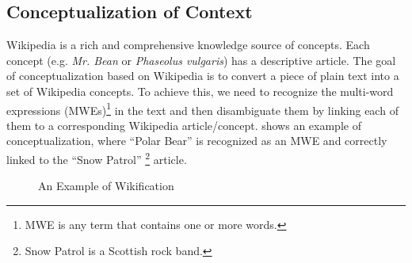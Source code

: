 \subsection{Conceptualization of Context}



Wikipedia is a rich and comprehensive knowledge source of concepts.
Each concept (e.g. {\em Mr. Bean} or {\em Phaseolus vulgaris}) has a
descriptive article.
The goal of conceptualization based on Wikipedia is
to convert a piece of plain text into a set of Wikipedia concepts.
To achieve this, we need to recognize the multi-word expressions 
(MWEs)\footnote{MWE is any term that contains one or more words.}
in the text and then disambiguate them
by linking each of them to a corresponding Wikipedia article/concept.
%
 shows an example of conceptualization, where
``Polar Bear'' is recognized as
an MWE and correctly linked to the ``Snow Patrol''
\footnote{Snow Patrol is a Scottish rock band.} article.
\begin{figure}
\centering
{}
\caption{An Example of Wikification}
\label{fig:screen-bear}
\end{figure}

